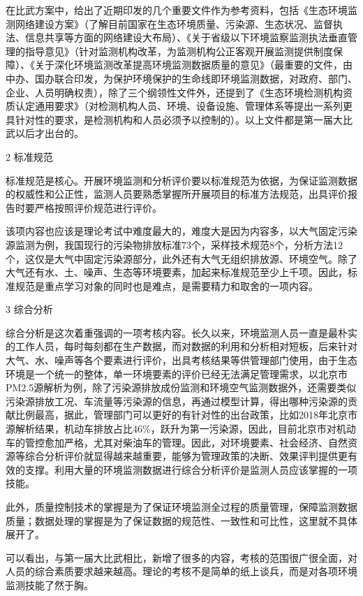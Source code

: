 \documentclass[
]{book}
\begin{document}
在比武方案中，给出了近期印发的几个重要文件作为参考资料，包括《生态环境监测网络建设方案》（了解目前国家在生态环境质量、污染源、生态状况、监督执法、信息共享等方面的网络建设大布局）、《关于省级以下环境监察监测执法垂直管理的指导意见》（针对监测机构改革，为监测机构公正客观开展监测提供制度保障）、《关于深化环境监测改革提高环境监测数据质量的意见》（最重要的文件，由中办、国办联合印发，为保护环境保护的生命线即环境监测数据，对政府、部门、企业、人员明确权责），除了三个纲领性文件外，还提到了《生态环境检测机构资质认定通用要求》（对检测机构人员、环境、设备设施、管理体系等提出一系列更具针对性的要求，是检测机构和人员必须予以控制的）。以上文件都是第一届大比武以后才出台的。

2 标准规范

标准规范是核心。开展环境监测和分析评价要以标准规范为依据，为保证监测数据的权威性和公正性，监测人员要熟悉掌握所开展项目的标准方法规范，出具评价报告时要严格按照评价规范进行评价。

该项内容也应该是理论考试中难度最大的，难度大是因为内容多，以大气固定污染源监测为例，我国现行的污染物排放标准73个，采样技术规范8个，分析方法12个，这仅是大气中固定污染源部分，此外还有大气无组织排放源、环境空气。除了大气还有水、土、噪声、生态等环境要素，加起来标准规范至少上千项。因此，标准规范是重点学习对象的同时也是难点，是需要精力和取舍的一项内容。

3 综合分析

综合分析是这次着重强调的一项考核内容。长久以来，环境监测人员一直是最朴实的工作人员，每时每刻都在生产数据，而对数据的利用和分析相对短板，后来针对大气、水、噪声等各个要素进行评价，出具考核结果等供管理部门使用，由于生态环境是一个统一的整体，单一环境要素的评价已经无法满足管理需求，以北京市PM2.5源解析为例，除了污染源排放成份监测和环境空气监测数据外，还需要类似污染源排放工况、车流量等污染源的信息，再通过模型计算，得出哪种污染源的贡献比例最高，据此，管理部门可以更好的有针对性的出台政策，比如2018年北京市源解析结果，机动车排放占比46\%，跃升为第一污染源，因此，目前北京市对机动车的管控愈加严格，尤其对柴油车的管理。因此，对环境要素、社会经济、自然资源等综合分析评价就显得越来越重要，能够为管理政策的决断、效果评判提供更有效的支撑。利用大量的环境监测数据进行综合分析评价是监测人员应该掌握的一项技能。

此外，质量控制技术的掌握是为了保证环境监测全过程的质量管理，保障监测数据质量；数据处理的掌握是为了保证数据的规范性、一致性和可比性，这里就不具体展开了。

可以看出，与第一届大比武相比，新增了很多的内容，考核的范围很广很全面，对人员的综合素质要求越来越高。理论的考核不是简单的纸上谈兵，而是对各项环境监测技能了然于胸。
\end{document}
